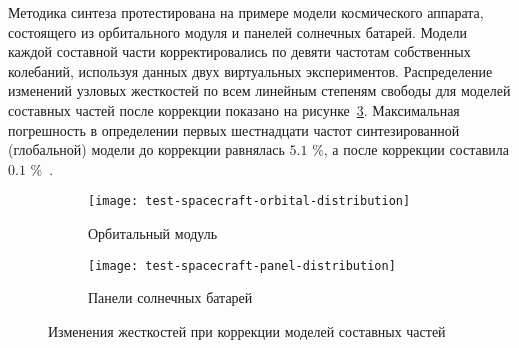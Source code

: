 Методика синтеза протестирована на примере модели космического аппарата, состоящего из орбитального модуля и панелей солнечных батарей. Модели каждой составной части корректировались по девяти частотам собственных колебаний, используя данных двух виртуальных экспериментов. Распределение изменений узловых жесткостей по всем линейным степеням свободы для моделей составных частей после коррекции показано на рисунке~\ref{fig:test-spacecraft-distribution}. Максимальная погрешность в определении первых шестнадцати частот синтезированной (глобальной) модели до коррекции равнялась $ 5.1 $ \%, а после коррекции составила $ 0.1 $ \%~. 
\vspace{-0.5em}
\begin{figure}[H]
	\centering
	\begin{subfigure}[t]{0.41\textwidth}
		\centering
		\texttt{[image: test-spacecraft-orbital-distribution]}
		\caption{Орбитальный модуль} \label{subfig:test-orbital-distribution}
	\end{subfigure}
	\qquad
	\begin{subfigure}[t]{0.39\textwidth}
		\centering
		\texttt{[image: test-spacecraft-panel-distribution]}
		\caption{Панели солнечных батарей} \label{subfig:test-panel-distribution}
	\end{subfigure}
	\vspace{0.7em}
	\caption{Изменения жесткостей при коррекции моделей составных частей} \label{fig:test-spacecraft-distribution} 
\end{figure}


